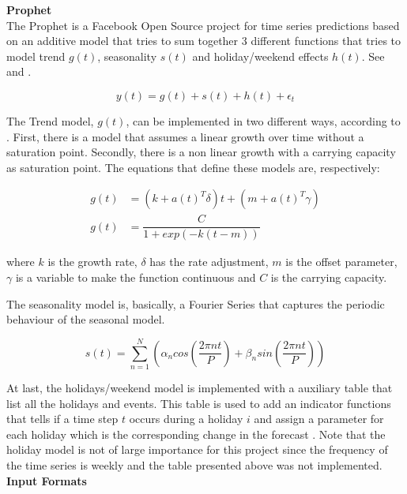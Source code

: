 \documentclass[10pt,twocolumn,letterpaper]{article}
\begin{document}
	
	
	\textbf{Prophet}\\
	
	The Prophet is a Facebook Open Source project for time series predictions based on an additive model that tries to sum together 3 different functions that tries to model trend $g(t)$, seasonality $s(t)$ and holiday/weekend effects $h(t)$. See \cite{taylor2018forecasting} and \cite{prophetwebsite}.
	
	\begin{equation}
		y(t)=g(t)+s(t)+h(t)+\epsilon_t
	\end{equation}
	
	The Trend model, $g(t)$, can be implemented in two different ways, according to \cite{taylor2018forecasting}. First, there is a model that assumes a linear growth over time without a saturation point. Secondly, there is a non linear growth with a carrying capacity as saturation point. The equations that define these models are, respectively:
	
	\begin{align}
		g(t)&=(k+a(t)^T\delta)t+(m+a(t)^T\gamma)\\
		g(t)&=\dfrac{C}{1+exp(-k(t-m))}
	\end{align}
	
	where $k$ is the growth rate, $\delta$ has the rate adjustment, $m$ is the offset parameter, $\gamma$ is a variable to make the function continuous and $C$ is the carrying capacity.
	
	The seasonality model is, basically, a Fourier Series that captures the periodic behaviour of the seasonal model.
	
	\begin{equation}
		s(t)=\sum_{n=1}^{N}\left(\alpha_ncos\left(\dfrac{2\pi nt}{P}\right)+\beta_nsin\left(\dfrac{2\pi nt}{P}\right)\right)
	\end{equation} 
	
	
	At last, the holidays/weekend model is implemented with a auxiliary table that list all the holidays and events. This table is used to add an indicator functions that tells if a time step $t$ occurs during a holiday $i$ and assign a parameter for each holiday which is the corresponding change in the forecast \cite{taylor2018forecasting}. Note that the holiday model is not of large importance for this project since the frequency of the time series is weekly and the table presented above was not implemented.\\ 
	
	\textbf{Input Formats}\\
	
\end{document}
